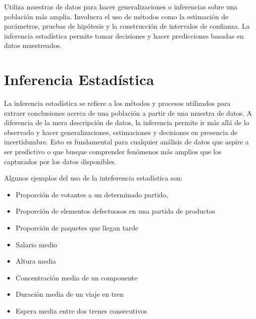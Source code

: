 \documentclass[
  letterpaper,
  DIV=11,
  numbers=noendperiod]{scrreprt}
\providecommand{\tightlist}{%
  \setlength{\itemsep}{0pt}\setlength{\parskip}{0pt}}\usepackage{longtable,booktabs,array}
\begin{document}
\begin{tcolorbox}[enhanced jigsaw, arc=.35mm, breakable, coltitle=black, left=2mm, opacityback=0, bottomtitle=1mm, colbacktitle=quarto-callout-note-color!10!white, title=\textcolor{quarto-callout-note-color}{\faInfo}\hspace{0.5em}{Estadística Inferencial}, titlerule=0mm, colback=white, colframe=quarto-callout-note-color-frame, bottomrule=.15mm, rightrule=.15mm, opacitybacktitle=0.6, toptitle=1mm, toprule=.15mm, leftrule=.75mm]

Utiliza muestras de datos para hacer generalizaciones o inferencias
sobre una población más amplia. Involucra el uso de métodos como la
estimación de parámetros, pruebas de hipótesis y la construcción de
intervalos de confianza. La inferencia estadística permite tomar
decisiones y hacer predicciones basadas en datos muestreados.

\end{tcolorbox}

\hypertarget{sec-inferencia}{%
\section{Inferencia Estadística}\label{sec-inferencia}}

La inferencia estadística se refiere a los métodos y procesos utilizados
para extraer conclusiones acerca de una población a partir de una
muestra de datos. A diferencia de la mera descripción de datos, la
inferencia permite ir más allá de lo observado y hacer generalizaciones,
estimaciones y decisiones en presencia de incertidumbre. Esto es
fundamental para cualquier análisis de datos que aspire a ser predictivo
o que busque comprender fenómenos más amplios que los capturados por los
datos disponibles.

Algunos ejemplos del uso de la inteferencia estadística son:

\begin{itemize}
\tightlist
\item
  Proporción de votantes a un determinado partido,
\item
  Proporción de elementos defectuosos en una partida de productos
\item
  Proporción de paquetes que llegan tarde
\item
  Salario medio
\item
  Altura media
\item
  Concentración media de un componente
\item
  Duración media de un viaje en tren
\item
  Espera media entre dos trenes consecutivos
\end{itemize}
\end{document}
